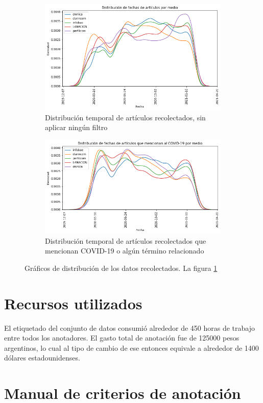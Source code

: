 \begin{figure}
    \centering
    \begin{subfigure}[t]{\textwidth}
        \includegraphics[width=\textwidth]{img/fechas_por_medios_todas.png}
        \caption{Distribución temporal de artículos recolectados, sin aplicar ningún filtro}
        \label{fig:fecha_articulos_por_medio_todas}
    \end{subfigure}

    \begin{subfigure}[t]{\textwidth}
        \includegraphics[width=\textwidth]{img/fechas_por_medios.png}
        \caption{Distribución temporal de artículos recolectados que mencionan COVID-19 o algún término relacionado}
        \label{fig:fecha_articulos_por_medio_covid}
    \end{subfigure}

    \caption{Gráficos de distribución de los datos recolectados. La figura \ref{fig:fecha_articulos_por_medio_todas}}
\end{figure}


\section{Recursos utilizados}

El etiquetado del conjunto de datos consumió alrededor de 450 horas de trabajo entre todos los anotadores. El gasto total de anotación fue de \num{125000} pesos argentinos, lo cual al tipo de cambio de ese entonces equivale a alrededor de \num{1400} dólares estadounidenses.

\section{Manual de criterios de anotación}
\label{app:manual_criterios_anotacion}
